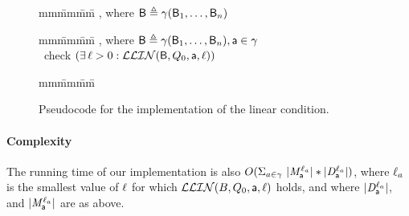 \begin{figure}[H]
\setcounter{lctr}{0}
\begin{tabbing}\label{alg:check-df}
mm\= mm\= mm\= \kill
{},  where $\mathsf{B} \triangleq \gamma(\mathsf{B}_1,\dots,\mathsf{B}_n)$\\
\lio{\ENDFOR;}
\end{tabbing}

\setcounter{lctr}{0}
\begin{tabbing}\label{alg:checkInt}
mm\= mm\= mm\= \kill
{},  where $\mathsf{B} \triangleq \gamma(\mathsf{B}_1,\dots,\mathsf{B}_n), \mathsf{a} \in \gamma$\\
\cmnt\ check $(\exists\, \ell > 0: \mathcal{LLIN}(\mathsf{B}, Q_0, \mathsf{a}, \ell))$\\
\lio{\WHILEC{\ttt}}
\lio{\ENDWHILE}
\end{tabbing}

\setcounter{lctr}{0}
\begin{tabbing}
\label{alg:eval-ldfc}
mm\= mm\= mm\= \kill
{}\\
  \lit{\FI}
\lio{\ENDFOR;}
\end{tabbing}

\caption{Pseudocode for the implementation of the linear condition.}
\label{fig:implementation}
\label{fig:implementation-checkDF}
\end{figure}

\paragraph{Complexity} The running  time of our implementation is
also 
$O(\Sigma_{a \in \gamma}\ |\mathit{M}_{\mathsf{a}}^{\ell_a}| * |\mathit{D}_{\mathsf{a}}^{\ell_a}|)$,
where $\ell_a$ is the smallest value of $\ell$ for which $\mathcal{LLIN}(B, Q_0, \mathsf{a}, \ell)$ holds, and where
$|\mathit{D}_{\mathsf{a}}^{\ell_a}|$, and $|\mathit{M}_{\mathsf{a}}^{\ell_a}|$ are as above.

